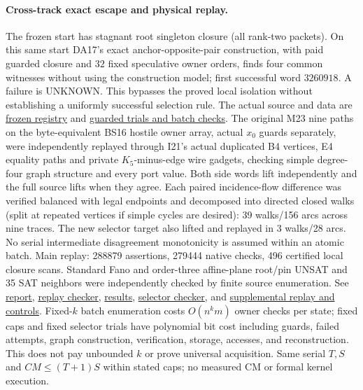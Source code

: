 \documentclass[11pt]{article}
\begin{document}
\paragraph{Cross-track exact escape and physical replay.}
The frozen start has stagnant root singleton closure (all rank-two packets). On this same start DA17's exact anchor-opposite-pair construction, with paid guarded closure and $32$ fixed speculative owner orders, finds four common witnesses without using the construction model; first successful word $3260918$. A failure is UNKNOWN. This bypasses the proved local isolation without establishing a uniformly successful selection rule. The actual source and data are \href{https://github.com/j15marti/pnp/commit/9164cb11c6fcdf96d470de9d86b061e3201a591f}{frozen registry} and \href{https://github.com/j15marti/pnp/commit/1b18798840e51e1bd076066a477e2f58d2a5b13c}{guarded trials and batch checks}. The original M23 nine paths on the byte-equivalent BS16 hostile owner array, actual $x_0$ guards separately, were independently replayed through I21's actual duplicated B4 vertices, E4 equality paths and private $K_5$-minus-edge wire gadgets, checking simple degree-four graph structure and every port value. Both side words lift independently and the full source lifts when they agree. Each paired incidence-flow difference was verified balanced with legal endpoints and decomposed into directed closed walks (split at repeated vertices if simple cycles are desired): 39 walks/156 arcs across nine traces. The new selector target also lifted and replayed in 3 walks/28 arcs. No serial intermediate disagreement monotonicity is assumed within an atomic batch. Main replay: 288879 assertions, 279444 native checks, 496 certified local closure scans. Standard Fano and order-three affine-plane root/pin UNSAT and 35 SAT neighbors were independently checked by finite source enumeration. See \href{https://github.com/j15marti/pnp/commit/db39f91f8ee5b8c2b59261a2eec370e88eaf7f23}{report}, \href{https://github.com/j15marti/pnp/commit/33233b35845ffb9744251cc97ba4908e300afb78}{replay checker}, \href{https://github.com/j15marti/pnp/commit/5c2b8042c782048e7e876fecabb55ca8ea15fd05}{results}, \href{https://github.com/j15marti/pnp/commit/98bd89baad51b20075fcca7f0e92d3ca7d865070}{selector checker}, and \href{https://github.com/j15marti/pnp/commit/f3b038b3abe719b260b86744a55fa7969d78f5ed}{supplemental replay and controls}. Fixed-$k$ batch enumeration costs $O(n^km)$ owner checks per state; fixed caps and fixed selector trials have polynomial bit cost including guards, failed attempts, graph construction, verification, storage, accesses, and reconstruction. This does not pay unbounded $k$ or prove universal acquisition. Same serial $T,S$ and $CM\le(T+1)S$ within stated caps; no measured CM or formal kernel execution.
\end{document}
